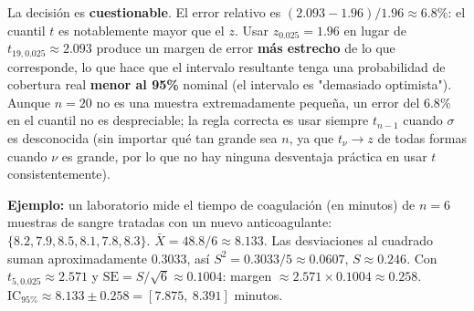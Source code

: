 \begin{solproblema}
	La decisión es \textbf{cuestionable}. El error relativo es $(2.093-1.96)/1.96 \approx 6.8\%$: el cuantil $t$ es notablemente mayor que el $z$. Usar $z_{0.025}=1.96$ en lugar de $t_{19,0.025}\approx2.093$ produce un margen de error \textbf{más estrecho} de lo que corresponde, lo que hace que el intervalo resultante tenga una probabilidad de cobertura real \textbf{menor al 95\%} nominal (el intervalo es "demasiado optimista"). Aunque $n=20$ no es una muestra extremadamente pequeña, un error del $6.8\%$ en el cuantil no es despreciable; la regla correcta es usar siempre $t_{n-1}$ cuando $\sigma$ es desconocida (sin importar qué tan grande sea $n$, ya que $t_\nu \to z$ de todas formas cuando $\nu$ es grande, por lo que no hay ninguna desventaja práctica en usar $t$ consistentemente).
\end{solproblema}

\begin{solproblema}[prob:c34507c]
	\textbf{Ejemplo:} un laboratorio mide el tiempo de coagulación (en minutos) de $n=6$ muestras de sangre tratadas con un nuevo anticoagulante: $\{8.2, 7.9, 8.5, 8.1, 7.8, 8.3\}$. $\bar X = 48.8/6 \approx 8.133$. Las desviaciones al cuadrado suman aproximadamente $0.3033$, así $S^2 = 0.3033/5 \approx 0.0607$, $S\approx0.246$. Con $t_{5,0.025}\approx2.571$ y $\text{SE}=S/\sqrt6\approx0.1004$: margen $\approx2.571\times0.1004\approx0.258$. $\text{IC}_{95\%} \approx 8.133\pm0.258 = [7.875,\ 8.391]$ minutos.
\end{solproblema}
